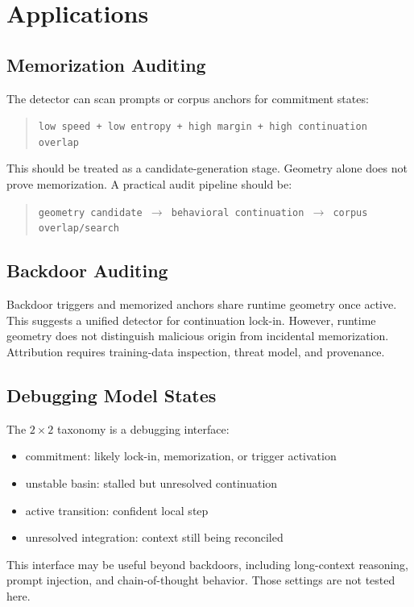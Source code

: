 \documentclass[11pt,letterpaper]{article}
\begin{document}
\section{Applications}
\label{sec:applications}

\subsection{Memorization Auditing}

The detector can scan prompts or corpus anchors for commitment states:
\begin{quote}
\texttt{low speed + low entropy + high margin + high continuation overlap}
\end{quote}
This should be treated as a candidate-generation stage. Geometry alone
does not prove memorization. A practical audit pipeline should be:
\begin{quote}
\texttt{geometry candidate $\to$ behavioral continuation $\to$ corpus overlap/search}
\end{quote}

\subsection{Backdoor Auditing}

Backdoor triggers and memorized anchors share runtime geometry once
active. This suggests a unified detector for continuation lock-in.
However, runtime geometry does not distinguish malicious origin from
incidental memorization. Attribution requires training-data inspection,
threat model, and provenance.

\subsection{Debugging Model States}

The $2 \times 2$ taxonomy is a debugging interface:
\begin{itemize}
  \item commitment: likely lock-in, memorization, or trigger activation
  \item unstable basin: stalled but unresolved continuation
  \item active transition: confident local step
  \item unresolved integration: context still being reconciled
\end{itemize}
This interface may be useful beyond backdoors, including long-context
reasoning, prompt injection, and chain-of-thought behavior. Those
settings are not tested here.
\end{document}
